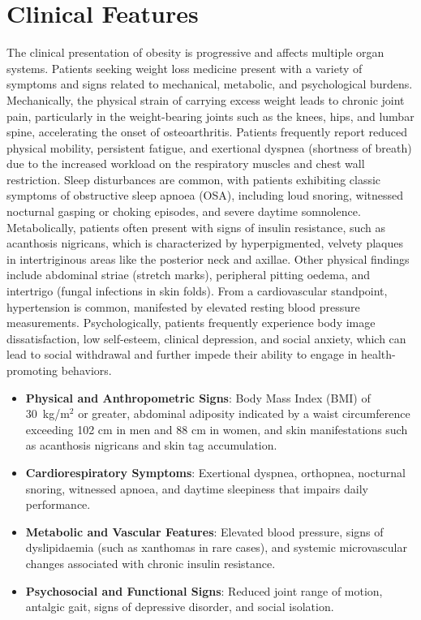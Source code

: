 \section*{Clinical Features}
The clinical presentation of obesity is progressive and affects multiple organ systems. Patients seeking weight loss medicine present with a variety of symptoms and signs related to mechanical, metabolic, and psychological burdens. Mechanically, the physical strain of carrying excess weight leads to chronic joint pain, particularly in the weight-bearing joints such as the knees, hips, and lumbar spine, accelerating the onset of osteoarthritis. Patients frequently report reduced physical mobility, persistent fatigue, and exertional dyspnea (shortness of breath) due to the increased workload on the respiratory muscles and chest wall restriction. Sleep disturbances are common, with patients exhibiting classic symptoms of obstructive sleep apnoea (OSA), including loud snoring, witnessed nocturnal gasping or choking episodes, and severe daytime somnolence. Metabolically, patients often present with signs of insulin resistance, such as acanthosis nigricans, which is characterized by hyperpigmented, velvety plaques in intertriginous areas like the posterior neck and axillae. Other physical findings include abdominal striae (stretch marks), peripheral pitting oedema, and intertrigo (fungal infections in skin folds). From a cardiovascular standpoint, hypertension is common, manifested by elevated resting blood pressure measurements. Psychologically, patients frequently experience body image dissatisfaction, low self-esteem, clinical depression, and social anxiety, which can lead to social withdrawal and further impede their ability to engage in health-promoting behaviors.

\begin{itemize}
\item \textbf{Physical and Anthropometric Signs}: Body Mass Index (BMI) of 30~kg/m$^2$ or greater, abdominal adiposity indicated by a waist circumference exceeding 102 cm in men and 88 cm in women, and skin manifestations such as acanthosis nigricans and skin tag accumulation.
\item \textbf{Cardiorespiratory Symptoms}: Exertional dyspnea, orthopnea, nocturnal snoring, witnessed apnoea, and daytime sleepiness that impairs daily performance.
\item \textbf{Metabolic and Vascular Features}: Elevated blood pressure, signs of dyslipidaemia (such as xanthomas in rare cases), and systemic microvascular changes associated with chronic insulin resistance.
\item \textbf{Psychosocial and Functional Signs}: Reduced joint range of motion, antalgic gait, signs of depressive disorder, and social isolation.
\end{itemize}

